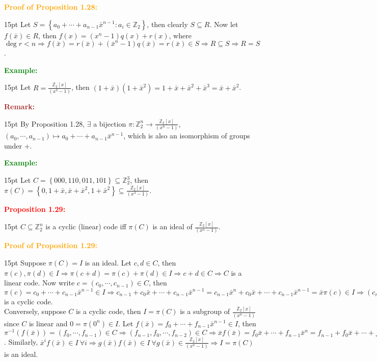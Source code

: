 \documentclass[12pt]{article}
\newcommand{\noparskip}{\vspace{-\parskip}}
\newenvironment{dent}
	{\begin{adjustwidth}{15pt}{}\noparskip}
	{\end{adjustwidth}}
\newenvironment{result}[1]
	{\textcolor{Red}{\textbf{#1:}}\begin{dent}}
	{\end{dent}}
\newenvironment{proof}[1]
	{\textcolor{Orange}{\textbf{Proof of #1:}}\begin{dent}}
	{\end{dent}}
\newenvironment{example}
	{\textcolor{Green}{\textbf{Example:}}\begin{dent}}
	{\end{dent}}
\newenvironment{remark}
	{\textcolor{Brown}{\textbf{Remark:}}\begin{dent}}
	{\end{dent}}
\renewcommand{\implies}{\Rightarrow}
\newcommand{\set}[1]{\left\{ #1 \right\}}
\newcommand{\Z}{\mathbb{Z}}
\newcommand{\Ztwox}{\Z_2[x]}
\newcommand{\gen}[1]{\left( #1 \right)}
\newcommand{\Ztwoxgen}[1]{\frac{\Ztwox}{\gen{#1}}}
\newcommand{\xbar}{\bar{x}}
\begin{document}
\begin{proof}{Proposition 1.28}
Let $S = \set{a_0 + \cdots + a_{n - 1} \xbar^{n - 1}: a_i \in \Z_2}$, then clearly $S \subseteq R$. Now let $f(\xbar) \in R$, then $f(x) = (x^n - 1)q(x) + r(x)$, where $\deg r < n \implies f(\xbar) = r(\xbar) + (\xbar^n - 1)q(\xbar) = r(\xbar) \in S \implies R \subseteq S \implies R = S$.
\end{proof}

\begin{example}
Let $R = \Ztwoxgen{x^3 - 1}$, then $(1 + \xbar)(1 + \xbar^2) = 1 + \xbar + \xbar^2 + \xbar^3 = \xbar + \xbar^2$.
\end{example}

\begin{remark}
By Proposition 1.28, $\exists$ a bijection $\pi: \Z_2^n \rightarrow \Ztwoxgen{x^n - 1}$, $(a_0, \cdots, a_{n - 1}) \mapsto a_0 + \cdots + a_{n - 1} \xbar^{n - 1}$, which is also an isomorphism of groups under +.
\end{remark}

\begin{example}
Let $C = \set{000, 110, 011, 101} \subseteq \Z_2^3$, then $\pi(C) = \set{0, 1 + \xbar, \xbar + \xbar^2, 1 + \xbar^2} \subseteq \Ztwoxgen{x^3 - 1}$.
\end{example}

\begin{result}{Proposition 1.29}
$C \subseteq \Z_2^n$ is a cyclic (linear) code iff $\pi(C)$ is an ideal of $\Ztwoxgen{x^n - 1}$.
\end{result}

\begin{proof}{Proposition 1.29}
Suppose $\pi(C) = I$ is an ideal. Let $c, d \in C$, then $\pi(c), \pi(d) \in I \implies \pi(c + d) = \pi(c) + \pi(d) \in I \implies c + d \in C \implies C$ is a linear code. Now write $c = (c_0, \cdots, c_{n - 1}) \in C$, then $\pi(c) = c_0 + \cdots + c_{n - 1} \xbar^{n - 1} \in I \implies c_{n - 1} + c_0 \xbar + \cdots + c_{n - 1} \xbar^{n - 1} = c_{n - 1} \xbar^n + c_0 \xbar + \cdots + c_{n - 1} \xbar^{n - 1} = \xbar \pi(c) \in I \implies (c_{n - 1}, c_0, \cdots, c_{n - 2}) \in C \implies C$ is a cyclic code. \\
Conversely, suppose $C$ is a cyclic code, then $I = \pi(C)$ is a subgroup of $\Ztwoxgen{x^n - 1}$ since $C$ is linear and $0 = \pi(0^n) \in I$. Let $f(\xbar) = f_0 + \cdots + f_{n - 1} \xbar^{n - 1} \in I$, then $\pi^{-1}(f(\xbar)) = (f_0, \cdots, f_{n - 1}) \in C \implies (f_{n - 1}, f_0, \cdots, f_{n - 2}) \in C \implies \xbar f(\xbar) = f_0 \xbar + \cdots + f_{n - 1} \xbar^n = f_{n - 1} + f_0 \xbar + \cdots + f_{n - 2} \xbar^{n - 1} \in I$. Similarly, $\xbar^i f(\xbar) \in I\ \forall i \implies g(\xbar)f(\xbar) \in I\ \forall g(\xbar) \in \Ztwoxgen{x^n - 1} \implies I = \pi(C)$ is an ideal.
\end{proof}
\end{document}
